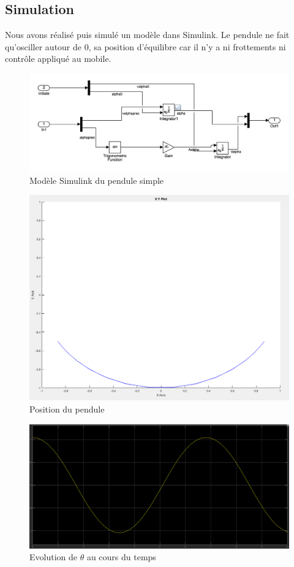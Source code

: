 \documentclass[11pt]{article}
\begin{document}
\subsection{Simulation}
Nous avons réalisé puis simulé un modèle dans Simulink. Le pendule ne fait qu'osciller autour de 0, sa position d'équilibre car il n'y a ni frottements ni contrôle appliqué au mobile.
\begin{figure}[h!]
	\includegraphics[scale=0.3]{images/pendule_simple_sys}
	\caption{Modèle Simulink du pendule simple}
	\label{model_pendule_simu}
\end{figure}
\begin{figure}[h!]
	\includegraphics[scale=0.3]{images/pendule_simple_XY}
	\caption{Position du pendule}
	\label{simu_pendule_xy}
\end{figure} 
\begin{figure}[h]
	\includegraphics[scale=0.3]{images/pendule_simple_graph}
	\caption{Evolution de $\theta$ au cours du temps}
	\label{simu_pendule}
\end{figure}\\
\end{document}
